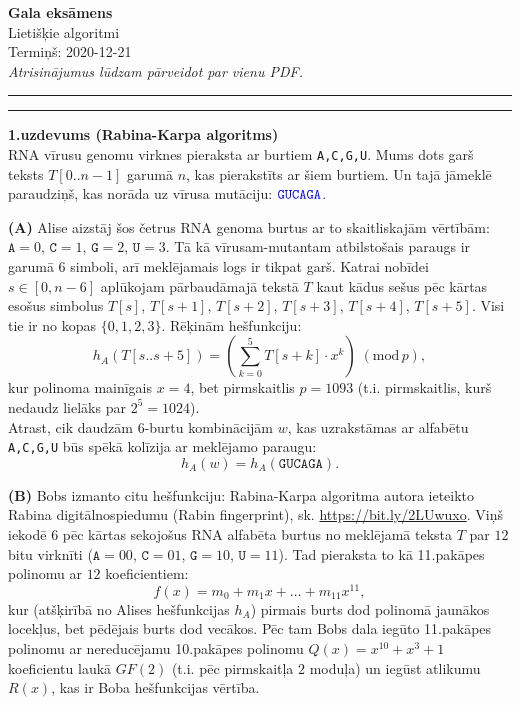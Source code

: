 \documentclass[a4paper,12pt]{article}
\begin{document}
\begin{center}
{\bf\Huge Gala eksāmens} \\[5pt]
Lietišķie algoritmi \\
Termiņš: 2020-12-21\\[5pt]
{\em Atrisinājumus lūdzam pārveidot par vienu PDF.}
\end{center}

\hrule
\vspace{2pt}
\hrule
\vspace{12pt}



\vspace{5pt}
{\bf 1.uzdevums (Rabina-Karpa algoritms)}\\
RNA vīrusu genomu virknes pieraksta ar burtiem {\tt A,C,G,U}.
Mums dots garš teksts $T[0..n-1]$ garumā $n$, kas pierakstīts ar 
šiem burtiem. Un tajā jāmeklē paraudziņš, kas norāda uz 
vīrusa mutāciju: $\textcolor{blue}{\mathtt{GUCAGA}}$. 

\vspace{5pt}
{\bf (A)} Alise aizstāj šos četrus RNA genoma burtus ar to skaitliskajām 
vērtībām: $\mathtt{A} = 0$, $\mathtt{C} = 1$, $\mathtt{G} = 2$, 
$\mathtt{U} = 3$. Tā kā vīrusam-mutantam atbilstošais paraugs ir garumā $6$ simboli, 
arī meklējamais logs ir tikpat garš. Katrai nobīdei $s \in [0,n-6]$ 
aplūkojam pārbaudāmajā tekstā $T$ kaut kādus sešus pēc kārtas esošus simbolus 
$T[s]$, $T[s+1]$, $T[s+2]$, $T[s+3]$, $T[s+4]$, $T[s+5]$. 
Visi tie ir no kopas $\{ 0,1,2,3 \}$. Rēķinām hešfunkciju: 
$$h_A(T[s..s+5]) = \left( \sum\limits_{k=0}^{5} T[s+k] \cdot x^k \right)\;(\text{mod}\,p),$$
kur polinoma mainīgais $x = 4$, bet pirmskaitlis $p = 1093$
(t.i. pirmskaitlis, kurš nedaudz lielāks par $2^5 = 1024$).\\


Atrast, cik daudzām $6$-burtu kombinācijām $w$, kas uzrakstāmas ar 
alfabētu {\tt A,C,G,U} būs spēkā kolīzija ar meklējamo paraugu:
$$h_A(w) = h_A(\mathtt{GUCAGA}).$$



\vspace{5pt}
{\bf (B)}
Bobs izmanto citu hešfunkciju: Rabina-Karpa algoritma 
autora ieteikto Rabina digitālnospiedumu 
(Rabin fingerprint), sk. \url{https://bit.ly/2LUwuxo}. 
Viņš iekodē $6$ pēc kārtas sekojošus RNA alfabēta burtus no 
meklējamā teksta $T$ par $12$ bitu virknīti
($\mathtt{A} = 00$, $\mathtt{C} = 01$, $\mathtt{G} = 10$, $\mathtt{U} = 11$). 
Tad pieraksta to kā 11.pakāpes polinomu ar $12$ koeficientiem: 
$$f(x) = m_0 + m_1 x + \ldots + m_{11} x^{11},$$
kur (atšķirībā no Alises hešfunkcijas $h_A$) pirmais burts dod polinomā jaunākos 
locekļus, bet pēdējais burts dod vecākos. 
Pēc tam Bobs dala iegūto 11.pakāpes polinomu ar nereducējamu 
10.pakāpes polinomu $Q(x) = x^{10} + x^3 + 1$ koeficientu laukā $GF(2)$
(t.i. pēc pirmskaitļa $2$ moduļa) un iegūst atlikumu 
$R(x)$, kas ir Boba hešfunkcijas vērtība. 
\end{document}
